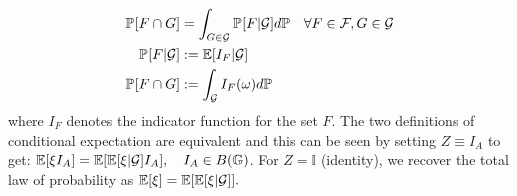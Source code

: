 \begin{defn}
\begin{align}
\mathbb{P}_{{}}{[F \cap G]} &= \int_{G \in \mathcal{G}}  \mathbb{P}_{{}}{[F | \mathcal{G}]} d\mathbb{P}\quad \forall F \in \mathcal{F}_{{}},  G \in \mathcal{G} \label{eqn:def:condprob}  \\
\mathbb{P}_{{}}{[F | \mathcal{G}]} & := \mathbb{E}[I_F | \mathcal{G}]  \\
\mathbb{P}_{{}}{[F \cap G]} &: = \int_{\mathcal{G}}  I_F (\omega) d\mathbb{P} 
\end{align} where $I_F$ denotes the indicator function for the set $F$. 
The two definitions of conditional expectation are equivalent and this can be seen by setting $Z \equiv I_A$ to get: $\mathbb{E}[\xi I_A] = \mathbb{E}[\mathbb{E}[\xi | \mathcal{G}] I_A], \quad I_A \in B(\mathbb{G})$. For $Z = \mathbb{I}$ (identity), we recover the total law of probability as $ \mathbb{E}[\xi] = \mathbb{E}[\mathbb{E}[\xi | \mathcal{G}]].$ 
\end{defn} 
 
